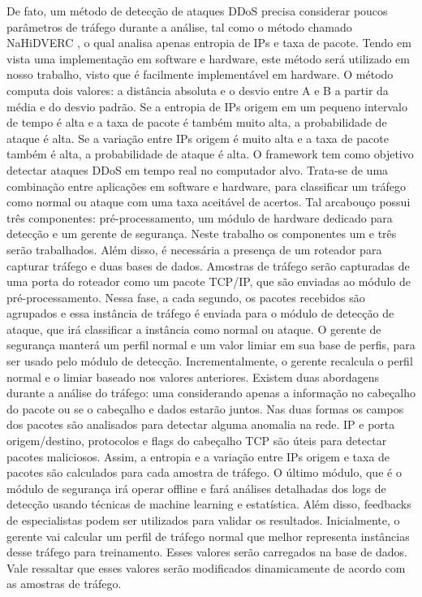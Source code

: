 De fato, um método de detecção de ataques DDoS precisa considerar poucos parâmetros de tráfego durante a análise, tal como o método chamado NaHiDVERC \cite{HOQUE201748}, o qual analisa apenas entropia de IPs e taxa de pacote. Tendo em vista uma implementação em software e hardware, este método será utilizado em nosso trabalho, visto que é facilmente implementável em hardware. O método computa dois valores: a distância absoluta e o desvio entre A e B a partir da média e do desvio padrão. Se a entropia de IPs origem em um pequeno intervalo de tempo é alta e a taxa de pacote é também muito alta, a probabilidade de ataque é alta. Se a variação entre IPs origem é muito alta e a taxa de pacote também é alta, a probabilidade de ataque é alta. O framework tem como objetivo detectar ataques DDoS em tempo real no computador alvo. Trata-se de uma combinação entre aplicações em software e hardware, para classificar um tráfego como normal ou ataque com uma taxa aceitável de acertos. Tal arcabouço possui três componentes: pré-processamento, um módulo de hardware dedicado para detecção e um gerente de segurança. Neste trabalho os componentes um e três serão trabalhados. Além disso, é necessária a presença de um roteador para capturar tráfego e duas bases de dados. Amostras de tráfego serão capturadas de uma porta do roteador como um pacote TCP/IP, que são enviadas ao módulo de pré-processamento. Nessa fase, a cada segundo, os pacotes recebidos são agrupados e essa instância de tráfego é enviada para o módulo de detecção de ataque, que irá classificar a instância como normal ou ataque. O gerente de segurança manterá um perfil normal e um valor limiar em sua base de perfis, para ser usado pelo módulo de detecção. Incrementalmente, o gerente recalcula o perfil normal e o limiar baseado nos valores anteriores. 
Existem duas abordagens durante a análise do tráfego: uma considerando apenas a informação no cabeçalho do pacote ou se o cabeçalho e dados estarão juntos. Nas duas formas os campos dos pacotes são analisados para detectar alguma anomalia na rede. IP e porta origem/destino, protocolos e flags do cabeçalho TCP são úteis para detectar pacotes maliciosos. Assim, a entropia e a variação entre IPs origem e taxa de pacotes são calculados para cada amostra de tráfego.
O último módulo, que é o módulo de segurança irá operar offline e fará análises detalhadas dos logs de detecção usando técnicas de machine learning e estatística. Além disso, feedbacks de especialistas podem ser utilizados para validar os resultados. Inicialmente, o gerente vai calcular um perfil de tráfego normal que melhor representa instâncias desse tráfego para treinamento. Esses valores serão carregados na base de dados. Vale ressaltar que esses valores serão modificados dinamicamente de acordo com as amostras de tráfego. 


